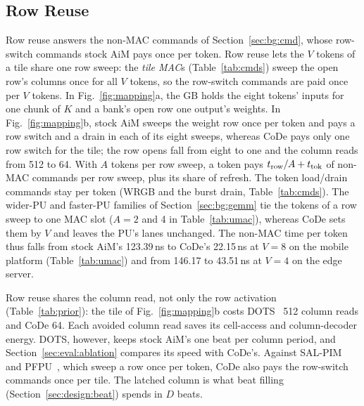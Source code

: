\subsection{Row Reuse}
\label{sec:design:reuse}

Row reuse answers the non-MAC commands of Section~\ref{sec:bg:cmd}, whose row-switch commands stock AiM pays once per
token. Row reuse lets the $V$ tokens of a tile share one row sweep: the \emph{tile MAC}s (Table~\ref{tab:cmds}) sweep the open row's columns once for
all $V$ tokens, so the row-switch commands are paid once per $V$ tokens. In Fig.~\ref{fig:mapping}a, the GB holds
the eight tokens' inputs for one chunk of $K$ and a bank's open row one output's weights. In Fig.~\ref{fig:mapping}b,
stock AiM sweeps the weight row once per token and pays a row switch and a drain in each of its eight sweeps, whereas
CoDe pays only one row switch for the tile; the row opens fall from eight to one and the column reads from 512 to 64. With $A$ tokens per row sweep, a token pays
$\trow / A + \ttok$ of non-MAC commands per row sweep, plus its share of refresh. The token load/drain commands stay
per token (WRGB and the burst drain, Table~\ref{tab:cmds}). The wider-PU and faster-PU families
of Section~\ref{sec:bg:gemm} tie the tokens of a row sweep to one MAC slot ($A = 2$ and 4 in Table~\ref{tab:umac}),
whereas CoDe sets them by $V$ and leaves the PU's lanes unchanged. The non-MAC time per token thus falls
from stock AiM's 123.39\,ns to CoDe's 22.15\,ns at $V = 8$ on the mobile platform (Table~\ref{tab:umac}) and from
146.17 to 43.51\,ns at $V = 4$ on the edge server.

\begin{table}[t]
  \caption{CoDe's commands, counted per token against stock AiM.}
  \label{tab:cmds}
  \centering
  \footnotesize
  \setlength{\tabcolsep}{2.5pt}
  
  \vspace{-5pt}
\end{table}

Row reuse shares the column read, not only the row activation (Table~\ref{tab:prior}): the tile of
Fig.~\ref{fig:mapping}b costs DOTS~\cite{dots} 512 column reads and CoDe 64. Each avoided column read saves its
cell-access and column-decoder energy. DOTS, however, keeps stock AiM's one beat per column period, and
Section~\ref{sec:eval:ablation} compares its speed with CoDe's. Against SAL-PIM~\cite{salpim} and PFPU~\cite{pfpu},
which sweep a row once per token, CoDe also pays the row-switch commands once per tile. The latched column is what beat filling (Section~\ref{sec:design:beat})
spends in $D$ beats.

